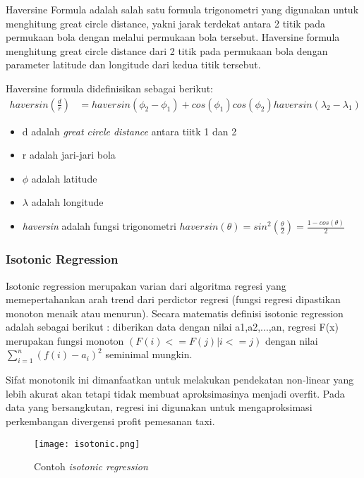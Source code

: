 \documentclass{article}
\begin{document}
\begin{adjustwidth}{4em}{0pt}
	
\hspace{\parindent}Haversine Formula adalah salah satu formula trigonometri yang digunakan untuk menghitung great circle distance, yakni jarak terdekat antara 2 titik pada permukaan bola dengan melalui permukaan bola tersebut. Haversine formula menghitung great circle distance dari 2 titik pada permukaan bola dengan parameter latitude dan longitude dari kedua titik tersebut.

Haversine formula didefinisikan sebagai berikut:
\begin{align*}
haversin(\frac{d}{r}) &= haversin(\phi _{2} - \phi _{1}) + cos(\phi _{1})cos(\phi _{2})haversin(\lambda _{2} - \lambda _{1})
\end{align*}
\begin{itemize}
	\setlength{\itemindent}{1cm}
	\item{d adalah \textit{great circle distance} antara tiitk 1 dan 2}
	\item{r adalah jari-jari bola}
	\item{$\phi$ adalah latitude}
	\item{$\lambda$ adalah longitude}
	\item{\textit{haversin} adalah fungsi trigonometri $haversin(\theta) = sin^2(\frac{\theta}{2}) = \frac{1-cos(\theta)}{2}$}
\end{itemize}

\end{adjustwidth}

\subsubsection{Isotonic Regression}
\begin{adjustwidth}{4em}{0pt}
	
\hspace{\parindent}Isotonic regression merupakan varian dari algoritma regresi yang memepertahankan arah trend dari perdictor regresi (fungsi regresi dipastikan monoton menaik atau menurun). Secara matematis definisi isotonic regression adalah sebagai berikut : diberikan data dengan nilai a1,a2,...,an, regresi F(x) merupakan fungsi monoton $(F(i) <= F(j) | i <= j)$  dengan nilai $\sum\limits_{i=1}^n({f(i)-a_{i}})^2$ seminimal mungkin.

Sifat monotonik ini dimanfaatkan untuk melakukan pendekatan  non-linear yang lebih akurat akan tetapi tidak membuat aproksimasinya menjadi overfit. Pada data yang bersangkutan, regresi ini digunakan untuk mengaproksimasi perkembangan divergensi profit pemesanan taxi.

\begin{figure}[H]
	\texttt{[image: isotonic.png]}
	\caption{Contoh \textit{isotonic regression}}
\end{figure}

\end{adjustwidth}
\end{document}
